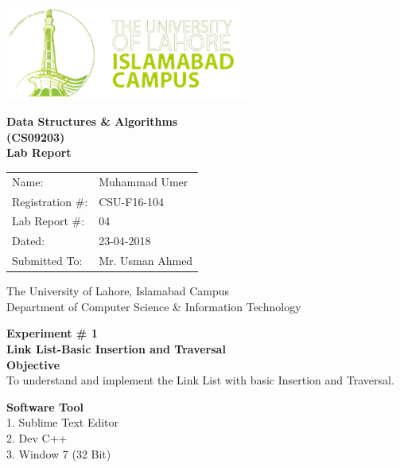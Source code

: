 \documentclass[11pt]{article}            %
\begin{document}
\begin{titlepage}
    \centering
  \vfill
    \includegraphics[width=8cm]{uni_logo.png} \\ 
	\vskip2cm
    {\bfseries\Large
	Data Structures  \& Algorithms \\ (CS09203)\\
	
	\vskip2cm
	Lab Report 
	 
	\vskip2cm
	}    

\begin{center}
\begin{tabular}{ l l  } 

Name: & Muhammad Umer \\ 
Registration \#: & CSU-F16-104 \\ 
Lab Report \#: & 04 \\ 
 Dated:& 23-04-2018\\ 
Submitted To:& Mr. Usman Ahmed\\ 

\end{tabular}
\end{center}
    \vfill
    The University of Lahore, Islamabad Campus\\
Department of Computer Science \& Information Technology
\end{titlepage}


    
    {\bfseries\Large
\centering
	Experiment \# 1 \\

Link List-Basic Insertion and Traversal\\
	
	}    
 \vskip1cm
 \textbf {Objective}\\  To understand and implement the Link List with basic Insertion and Traversal.
 
 \textbf {Software Tool} \\
1. Sublime Text Editor\\
2. Dev C++\\
3. Window 7 (32 Bit)\\
\end{document}
